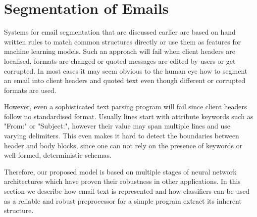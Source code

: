 \documentclass{llncs}
\begin{document}










\section{Segmentation of Emails}
\label{sec:model}
Systems for email segmentation that are discussed earlier are based on hand written rules to match common structures directly or use them as features for machine learning models.
Such an approach will fail when client headers are localised, formats are changed or quoted messages are edited by users or get corrupted.
In most cases it may seem obvious to the human eye how to segment an email into client headers and quoted text even though different or corrupted formats are used.

However, even a sophisticated text parsing program will fail since client headers follow no standardised format.
Usually lines start with attribute keywords such as "From:" or "Subject:", however their value may span multiple lines and use varying delimiters.
This even makes it hard to detect the boundaries between header and body blocks, since one can not rely on the presence of keywords or well formed, deterministic schemas.

Therefore, our proposed model is based on multiple stages of neural network architectures which have proven their robustness in other applications.
In this section we describe how email text is represented and how classifiers can be used as a reliable and robust preprocessor for a simple program extract its inherent structure.
\end{document}
